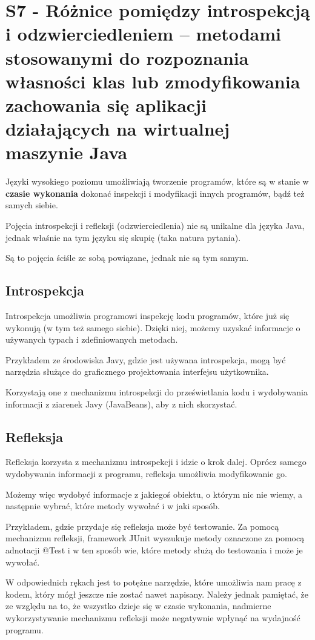 \section{S7 - Różnice pomiędzy introspekcją i odzwierciedleniem – metodami stosowanymi do rozpoznania własności klas lub zmodyfikowania zachowania się aplikacji działających na wirtualnej maszynie Java}

Języki wysokiego poziomu umożliwiają tworzenie programów, które są w stanie w \textbf{czasie wykonania} dokonać inspekcji i modyfikacji innych programów, bądź też samych siebie.

Pojęcia introspekcji i refleksji (odzwierciedlenia) nie są unikalne dla języka Java, jednak właśnie na tym języku się skupię (taka natura pytania).

Są to pojęcia ściśle ze sobą powiązane, jednak nie są tym samym.

\subsection{Introspekcja}

Introspekcja umożliwia programowi inspekcję kodu programów, które już się wykonują (w tym też samego siebie).
Dzięki niej, możemy uzyskać informacje o używanych typach i zdefiniowanych metodach.

Przykładem ze środowiska Javy, gdzie jest używana introspekcja, mogą być narzędzia służące do graficznego projektowania interfejsu użytkownika.

Korzystają one z mechanizmu introspekcji do prześwietlania kodu i wydobywania informacji z ziarenek Javy (JavaBeans), aby z nich skorzystać.

\subsection{Refleksja}

Refleksja korzysta z mechanizmu introspekcji i idzie o krok dalej.
Oprócz samego wydobywania informacji z programu, refleksja umożliwia modyfikowanie go.

Możemy więc wydobyć informacje z jakiegoś obiektu, o którym nic nie wiemy, a następnie wybrać, które metody wywołać i w jaki sposób.

Przykładem, gdzie przydaje się refleksja może być testowanie.
Za pomocą mechanizmu refleksji, framework JUnit wyszukuje metody oznaczone za pomocą adnotacji @Test i w ten sposób wie, które metody służą do testowania i może je wywołać.

W odpowiednich rękach jest to potężne narzędzie, które umożliwia nam pracę z kodem, który mógł jeszcze nie zostać nawet napisany.
Należy jednak pamiętać, że ze względu na to, że wszystko dzieje się w czasie wykonania, nadmierne wykorzystywanie mechanizmu refleksji może negatywnie wpłynąć na wydajność programu.
